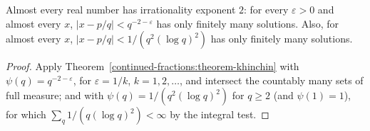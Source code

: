 \begin{corollary}\label{continued-fractions:corollary-almost-all-exponent}
Almost every real number has irrationality exponent $2$: for every $\varepsilon > 0$ and almost every $x$, $|x - p/q| < q^{-2-\varepsilon}$ has only finitely many solutions. Also, for almost every $x$,
$|x - p/q| < 1/(q^2(\log q)^2)$ has only finitely many solutions.
\end{corollary}

\begin{proof}
Apply Theorem~\ref{continued-fractions:theorem-khinchin} with $\psi(q) = q^{-2-\varepsilon}$, for $\varepsilon = 1/k$, $k = 1, 2, \ldots$, and intersect the countably many sets of full measure; and with
$\psi(q) = 1/(q^2(\log q)^2)$ for $q \geq 2$ (and $\psi(1) = 1$), for which $\sum_q1/(q(\log q)^2) < \infty$ by the integral test.
\end{proof}

